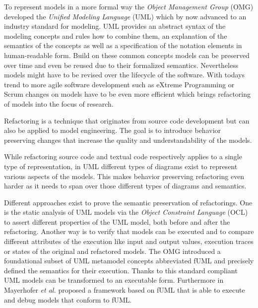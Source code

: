 \documentclass{llncs}
\begin{document}

To represent models in a more formal way the \textit{Object Management Group} (OMG) developed the \textit{Unified Modeling Language} (UML) 
\cite{man:UML} which by now advanced to an industry standard for 
modeling. UML provides an abstract syntax of the modeling concepts and rules how to combine them, an explanation 
of the semantics of the concepts as well as a specification of the notation elements in human-readable form.
Build on these common concepts models can be preserved over time and even be reused due to their formalized semantics. Nevertheless models 
might have to be revised over the lifecycle of the software. With todays trend to more agile software 
development such as eXtreme Programming \cite{DBLP:journals/computer/Beck99} or Scrum \cite{DBLP:journals/software/RisingJ00} 
changes on models have to be even more efficient which brings refactoring of models into the focus of research.


Refactoring is a technique that originates from source code development but can also be applied to model engineering.
The goal is to introduce behavior preserving changes \cite{mast:REFOOF} that increase the quality and understandability
of the models.


While refactoring source code and textual code respectively applies to a single type of representation, in UML different
types of diagrams exist to represent various aspects of the models. This makes behavior preserving refactoring even harder 
as it needs to span over those different types of diagrams and semantics.


Different approaches exist to prove the semantic preservation of refactorings. One is the static analysis of
UML models via the \textit{Object Constraint Language} (OCL) \cite{man:OCL} to assert different properties of the UML model, both before 
and after the refactoring. Another way is to verify that models can be executed and to compare 
different attributes of the execution like input and output values, execution traces or states of the 
original and refactored models. The OMG introduced a foundational subset 
of UML metamodel concepts abbreviated fUML \cite{man:FUML} and precisely defined the semantics for their execution. Thanks 
to this standard compliant UML models can be transformed to an executable form. 
Furthermore in \cite{DBLP:conf/icse/Mayerhofer12} Mayerhofer \textit{et al.} proposed a framework based on fUML that is able to execute
and debug models that conform to fUML.
\end{document}
